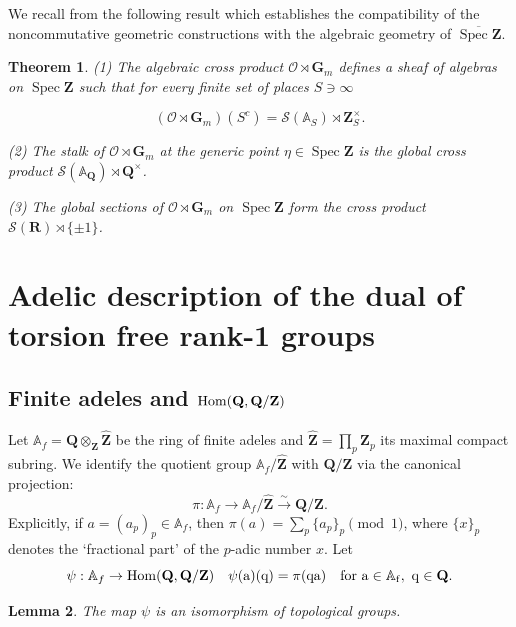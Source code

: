 \documentclass[11pt,a4paper]{article}
\newcommand{\Q}{\mathbf{Q}}
\newcommand{\Z}{\mathbf{Z}}
\newcommand{\A}{\mathbb{A}}
\newcommand{\Zhat}{\widehat{\Z}}
\def\Hom{\rm{Hom}}
\def\spz{\Spec \Z}
\def\spzb{\overline{\Spec \Z}}
\newcommand{\Spec}{\operatorname{Spec}}
\def\spz{\Spec \Z}
\theoremstyle{plain}
\newtheorem{thm}{Theorem}[section]
\newtheorem{lem}[thm]{Lemma}
\theoremstyle{definition} %
\begin{document}
We recall from \cite{CC3} the following result which establishes the compatibility of the noncommutative geometric constructions with the algebraic geometry of $\spzb$.

\begin{thm}
(1) The algebraic cross product $\mathscr{O} \rtimes \mathbf{G}_m$ defines a sheaf of algebras on $\spz$ such that for every finite set of places $S \ni \infty$

$$
\left(\mathscr{O} \rtimes \mathbf{G}_m\right)\left(S^c\right)=\mathcal{S}\left(\mathbb{A}_S\right) \rtimes \mathbf{Z}_S^{\times}.
$$

(2) The stalk of $\mathscr{O} \rtimes \mathbf{G}_m$ at the generic point $\eta\in \spz$ is the global cross product $\mathcal{S}\left(\mathbb{A}_{\mathbf{Q}}\right) \rtimes \mathbf{Q}^{\times}$.

(3) The global sections of $\mathscr{O} \rtimes \mathbf{G}_m$ on $\spz$ form the cross product $\mathcal{S}(\mathbf{R}) \rtimes\{ \pm 1\}$.
\end{thm}





 \appendix
 \section{Adelic description of the dual  of torsion free rank-1 groups}\label{appendual}

\subsection{Finite adeles and $\Hom(\Q, \Q/\Z)$}
 Let $\A_f = \Q \otimes_{\Z} \Zhat$ be the ring of finite adeles and 
 $\Zhat = \prod_p \Z_p$ its maximal compact subring.
We identify the quotient group $\A_f / \Zhat$ with $\Q/\Z$ via the canonical projection:
\begin{equation} \label{quotad}
\pi: \A_f \longrightarrow \A_f/\Zhat \xrightarrow{\sim} \Q/\Z.
\end{equation}
Explicitly, if $a = (a_p)_p \in \A_f$, then $\pi(a) = \sum_p \{a_p\}_p \pmod 1$, where $\{x\}_p$ denotes the `fractional part' of the $p$-adic number $x$. 
Let 
\begin{equation} \label{quotad1}
\psi: \A_f \to \Hom(\Q, \Q/\Z)\quad 
\psi(a)(q) = \pi(qa) \quad \text{for } a \in \A_f,~ q \in \Q.
\end{equation}
\begin{lem}\label{isopsi}
The map $\psi$ is an isomorphism of topological groups.
\end{lem}
\end{document}
